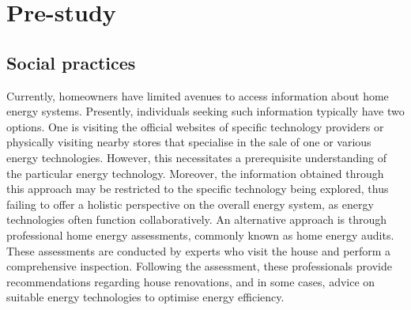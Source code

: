 \chapter{Pre-study} 





\section{Social practices}

Currently, homeowners have limited avenues to access information about home energy systems. 
Presently, individuals seeking such information typically have two options. 
One is visiting the official websites of specific technology providers or physically visiting nearby stores that specialise in the sale of one or various energy technologies. 
However, this necessitates a prerequisite understanding of the particular energy technology.
Moreover, the information obtained through this approach may be restricted to the specific technology being explored, thus failing to offer a holistic perspective on the overall energy system, as energy technologies often function collaboratively.
An alternative approach is through professional home energy assessments, commonly known as home energy audits.
These assessments are conducted by experts who visit the house and perform a comprehensive inspection. 
Following the assessment, these professionals provide recommendations regarding house renovations, and in some cases, advice on suitable energy technologies to optimise energy efficiency.



